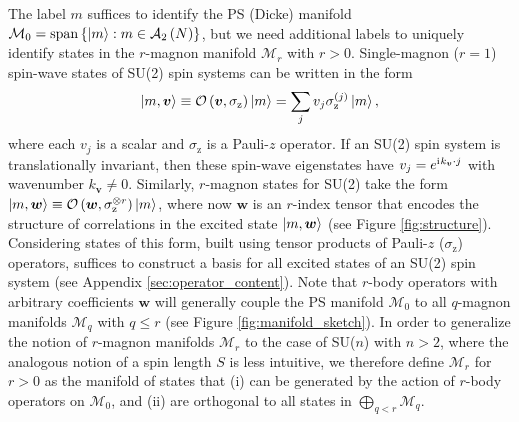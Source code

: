 \documentclass[nofootinbib,notitlepage,11pt]{revtex4-2}
\newcommand{\p}[1]{\left(#1\right)} %
\renewcommand{\set}[1]{\left\{#1\right\}} %
\renewcommand{\c}{\cdot} %
\newcommand{\m}{\bm} %
\newcommand{\1}{\mathds{1}}
\renewcommand{\i}{\mathrm{i}\mkern1mu}
\newcommand{\z}{\text{z}}
\newcommand{\A}{\mathcal{A}}
\newcommand{\M}{\mathcal{M}}
\renewcommand{\O}{\mathcal{O}}
\newcommand{\oper}{\operatorname}
\begin{document}
The label $m$ suffices to identify the PS (Dicke) manifold
$\M_0=\oper{span}\set{\ket{m}:m\in\A_2\p{N}}$, but we need additional
labels to uniquely identify states in the $r$-magnon manifold $\M_r$
with $r>0$.  Single-magnon ($r=1$) spin-wave states of SU(2) spin
systems can be written in the form
\begin{align}
  \ket{m,\m v} \equiv \O\p{\m v,\sigma_\z} \ket{m}
  = \sum_j v_j \sigma_\z^{(j)} \ket{m},
\end{align}
where each $v_j$ is a scalar and $\sigma_\z$ is a Pauli-$z$ operator.
If an SU(2) spin system is translationally invariant, then these
spin-wave eigenstates have $v_j=e^{\i k_{\m v}\c j}$ with wavenumber
$k_{\m v}\ne0$.  Similarly, $r$-magnon states for SU(2) take the form
$\ket{m,\m w}\equiv\O\p{\m w,\sigma_\z^{\otimes r}}\ket{m}$, where now
$\m w$ is an $r$-index tensor that encodes the structure of
correlations in the excited state $\ket{m,\m w}$ (see Figure
\ref{fig:structure}).  Considering states of this form, built using
tensor products of Pauli-$z$ ($\sigma_\z$) operators, suffices to
construct a basis for all excited states of an SU(2) spin system (see
Appendix \ref{sec:operator_content}).  Note that $r$-body operators
with arbitrary coefficients $\m w$ will generally couple the PS
manifold $\M_0$ to all $q$-magnon manifolds $\M_q$ with $q\le r$ (see
Figure \ref{fig:manifold_sketch}).  In order to generalize the notion
of $r$-magnon manifolds $\M_r$ to the case of SU($n$) with $n>2$,
where the analogous notion of a spin length $S$ is less intuitive, we
therefore define $\M_r$ for $r>0$ as the manifold of states that (i)
can be generated by the action of $r$-body operators on $\M_0$, and
(ii) are orthogonal to all states in $\bigoplus_{q<r}\M_q$.
\end{document}
